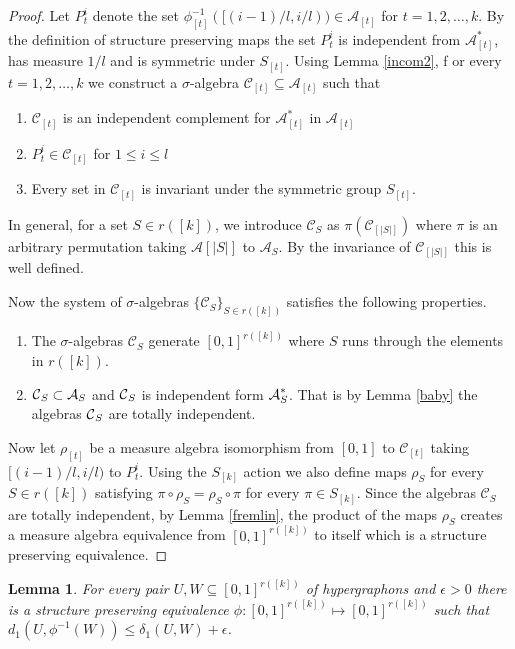 \documentclass [11pt] {article}
\newtheorem{lemma}{Lemma}[section]
\def\cA{\mbox{$\cal A$}}
\def\cC{\mbox{$\cal C$}}
\def\cA{\mbox{$\cal A$}}
\def\cC{\mbox{$\cal C$}}
\begin{document}
\begin{proof} Let $P_t^i$ denote the set 
$\phi_{[t]}^{-1}([(i-1)/l,i/l))\in\mathcal{A}_{[t]}$ for $t=1,2,\dots,k$. By
the definition of structure preserving maps the set $P_t^i$ is 
independent from $\mathcal{A}_{[t]}^*$, has measure $1/l$ and is 
symmetric under $S_{[t]}$.
Using Lemma \ref{incom2}, f
or every $t=1,2,\dots,k$ we construct a $\sigma$-algebra 
$\mathcal{C}_{[t]}\subseteq \mathcal{A}_{[t]}$ such that
\begin{enumerate}
\item $\mathcal{C}_{[t]}$ is an independent complement for 
$\mathcal{A}_{[t]}^*$ in $\mathcal{A}_{[t]}$
\item $P_t^i\in\mathcal{C}_{[t]}$ for $1\leq i\leq l$
\item Every set in $\mathcal{C}_{[t]}$ is invariant under the 
symmetric group $S_{[t]}$.
\end{enumerate}
In general, for a set $S\in r([k])$, we introduce $\mathcal{C}_S$ as
$\pi(\mathcal{C}_{[|S|]})$ where $\pi$ is an arbitrary 
permutation taking $\mathcal{A}{[|S|]}$ to $\mathcal{A}_S$. By the 
invariance of $\mathcal{C}_{[|S|]}$ this is well defined.

Now the system of $\sigma$-algebras $\{\mathcal{C}_S\}_{S\in r([k])}$ 
satisfies the following properties.
\begin{enumerate}
\item The $\sigma$-algebras $\mathcal{C}_S$ generate $[0,1]^{r([k])}$ 
where $S$ runs through the elements in $r([k])$.
\item $\cC_S\subset \cA_S$ and $\cC_S$ is independent form $\cA_S^*$.
That is by Lemma \ref{baby} the algebras $\cC_S$ are totally independent.
\end{enumerate}
Now let $\rho_{[t]}$ be a measure algebra isomorphism from $[0,1]$ to
$\mathcal{C}_{[t]}$ taking $[(i-1)/l,i/l)$ to $P_t^i$. Using the 
$S_{[k]}$ action we also define maps $\rho_S$ for every $S\in r([k])$ 
satisfying $\pi\circ\rho_S=\rho_S\circ\pi$ for every $\pi\in S_{[k]}$.
Since the algebras $\mathcal{C}_S$ are totally 
independent, by Lemma \ref{fremlin},
the product of the maps $\rho_S$ creates a measure algebra 
equivalence from $[0,1]^{r([k])}$ to itself which is a 
structure preserving equivalence.
\end{proof}

\begin{lemma}\label{stequiv} For every pair $U,W\subseteq [0,1]^{r([k])}$ 
of hypergraphons and $\epsilon>0$ there is a structure preserving 
equivalence $\phi:[0,1]^{r([k])}\mapsto[0,1]^{r([k])}$ 
such that $d_1(U,\phi^{-1}(W))\leq\delta_1(U,W)+\epsilon$.
\end{lemma}
\end{document}
